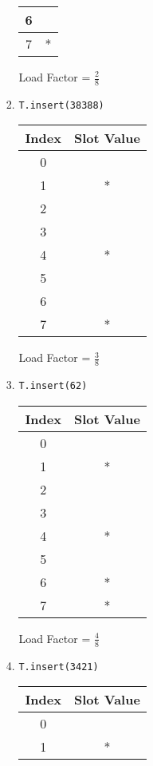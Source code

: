 \documentclass[11pt]{article}
\begin{document}
\begin{enumerate}
\begin{enumerate}
\begin{enumerate}
\begin{center}
\begin{tabular}{|c | c|}
\hline
6 & \\
\hline
7 & * \\
\hline
\end{tabular}
\end{center}
Load Factor = $\frac{2}{8}$
\item
\begin{verbatim}
T.insert(38388)
\end{verbatim}
\begin{center}
\begin{tabular}{|c | c|}
\hline
Index & Slot Value\\
\hline
0 & \\
\hline
1 & *\\
\hline
2 & \\
\hline
3 & \\
\hline
4 & *\\
\hline
5 & \\
\hline
6 & \\
\hline
7 & *\\
\hline
\end{tabular}
\end{center}
Load Factor = $\frac{3}{8}$
\item
\begin{verbatim}
T.insert(62)
\end{verbatim}
\begin{center}
\begin{tabular}{|c | c|}
\hline
Index & Slot Value\\
\hline
0 & \\
\hline
1 & *\\
\hline
2 & \\
\hline
3 & \\
\hline
4 & *\\
\hline
5 & \\
\hline
6 & *\\
\hline
7 & *\\
\hline
\end{tabular}
\end{center}
Load Factor = $\frac{4}{8}$
\item
\begin{verbatim}
T.insert(3421)
\end{verbatim}
\begin{center}
\begin{tabular}{|c | c|}
\hline
Index & Slot Value\\
\hline
0 & \\
\hline
1 & *\\
\hline

\end{tabular}
\end{center}
\end{enumerate}
\end{enumerate}
\end{enumerate}
\end{document}
